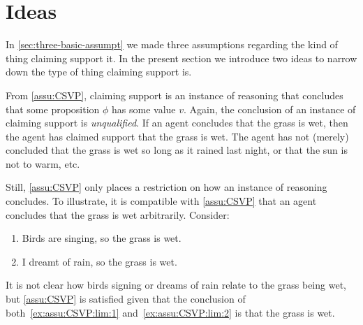 \section{Ideas}
\label{sec:two-ideas}

\begin{note}
    In \ref{sec:three-basic-assumpt} we made three assumptions regarding the kind of thing claiming support it.
  In the present section we introduce two ideas to narrow down the type of thing claiming support is.
\end{note}

\begin{note}
  From \autoref{assu:CSVP}, claiming support is an instance of reasoning that concludes that some proposition \(\phi\) has some value \(v\).
  Again, the conclusion of an instance of claiming support is \emph{unqualified}.
  If an agent concludes that the grass is wet, then the agent has claimed support that the grass is wet.
  The agent has not (merely) concluded that the grass is wet so long as it rained last night, or that the sun is not to warm, etc.\

  Still, \autoref{assu:CSVP} only places a restriction on how an instance of reasoning concludes.
  To illustrate, it is compatible with \autoref{assu:CSVP} that an agent concludes that the grass is wet arbitrarily.
  Consider:
  \begin{enumerate}
  \item\label{ex:assu:CSVP:lim:1} Birds are singing, so the grass is wet.
  \item\label{ex:assu:CSVP:lim:2} I dreamt of rain, so the grass is wet.
  \end{enumerate}
  It is not clear how birds signing or dreams of rain relate to the grass being wet, but \autoref{assu:CSVP} is satisfied given that the conclusion of both~\ref{ex:assu:CSVP:lim:1} and~\ref{ex:assu:CSVP:lim:2} is that the grass is wet.
\end{note}

